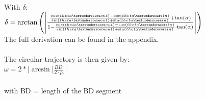 \documentclass[12pt, letterpaper]{article}
\begin{document}
\\
With $\delta$: \\
$\delta = \arctan\left( \Bigg| \frac{\frac{cos(theta\textunderscore out)-\cos(theta\textunderscore in)}{\sin(theta\textunderscore out)+\sin(theta\textunderscore in)}+\tan(\alpha)}{1-\frac{cos(theta\textunderscore out)-\cos(theta\textunderscore in)}{\sin(theta\textunderscore out)+\sin(theta\textunderscore in)}\cdot\tan(\alpha)}\Bigg| \right)$ \\
The full derivation can be found in the appendix.\\
\\
The circular trajectory is then given by:\\
$\omega = 2*\Bigg|\arcsin\Big[\frac{BD}{2\cdot\rho}\Big] \Bigg|$\\
\\
with BD = length of the BD segment\\
\end{document}

